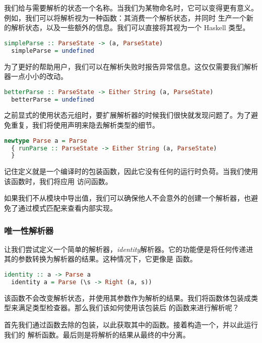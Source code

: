 \documentclass[./main.tex]{subfiles}
\begin{document}
我们给与需要解析的状态一个名称。当我们为某物命名时，它可以变得更有意义。例如，我们可以将解析视为一种函数：其消费一个解析状态，并同时
生产一个新的解析状态，以及一些额外的信息。我们可以直接将其视为一个 Haskell 类型。

\begin{lstlisting}[language=Haskell]
  simpleParse :: ParseState -> (a, ParseState)
  simpleParse = undefined
\end{lstlisting}

为了更好的帮助用户，我们可以在解析失败时报告异常信息。这仅仅需要我们解析器一点小小的改动。

\begin{lstlisting}[language=Haskell]
  betterParse :: ParseState -> Either String (a, ParseState)
  betterParse = undefined
\end{lstlisting}

之前显式的使用状态元组时，要扩展解析器的时候我们很快就发现问题了。为了避免重复，我们将使用声明来隐去解析类型的细节。

\begin{lstlisting}[language=Haskell]
  newtype Parse a = Parse
  { runParse :: ParseState -> Either String (a, ParseState)
  }
\end{lstlisting}

记住定义就是一个编译时的包装函数，因此它没有任何的运行时负荷。当我们使用该函数时，我们将应用
访问函数。

如果我们不从模块中导出值，我们可以确保他人不会意外的创建一个解析器，也避免了通过模式匹配来查看内部实现。

\subsubsection*{唯一性解析器}

让我们尝试定义一个简单的解析器，\textit{identity}解析器。它的功能便是将任何传递进其的参数转换为解析器的结果。这种情况下，它更像是
函数。

\begin{lstlisting}[language=Haskell]
  identity :: a -> Parse a
  identity a = Parse (\s -> Right (a, s))
\end{lstlisting}

该函数不会改变解析状态，并使用其参数作为解析的结果。我们将函数体包装成类型来满足类型检查器。那么我们该如何使用该包装后
的函数来进行解析呢？

首先我们通过函数去除的包装，以此获取其中的函数。接着构造一个，并以此运行我们的
解析函数。最后则是将解析的结果从最终的中分离。
\end{document}
